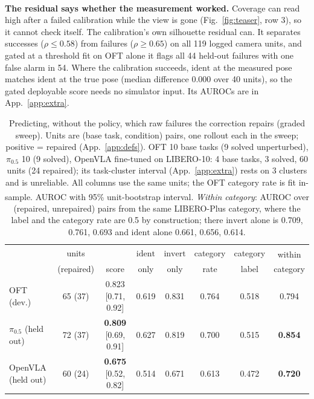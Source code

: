 \documentclass{article}
\newcommand{\ident}{\mathrm{ident}}
\newcommand{\invert}{\mathrm{invert}}
\newcommand{\pihalf}{$\pi_{0.5}$}
\newcommand{\ph}{\textsuperscript{\dag}}
\begin{document}
\textbf{The residual says whether the measurement worked.}\ph{} Coverage can read high after a failed calibration
while the view is gone (Fig.~\ref{fig:teaser}, row 3), so it cannot check itself. The calibration's own silhouette
residual can. It separates successes ($\rho \le 0.58$) from failures ($\rho \ge 0.65$) on all 119 logged camera units,
and gated at a threshold fit on OFT alone it flags all 44 held-out failures with one false alarm in 54. Where the
calibration succeeds, $\ident$ at the measured pose matches $\ident$ at the true pose (median difference 0.000 over 40
units), so the gated deployable score needs no simulator input. Its AUROCs are in App.~\ref{app:extra}.

\begin{table}[t]
\centering\footnotesize
\caption{Predicting, without the policy, which raw failures the correction repairs (graded sweep). Units are (base
task, condition) pairs, one rollout each in the sweep; positive = repaired (App.~\ref{app:defs}). OFT 10 base tasks (9
solved unperturbed), \pihalf{} 10 (9 solved), OpenVLA fine-tuned on LIBERO-10: 4 base tasks, 3 solved, 60 units (24
repaired); its task-cluster interval (App.~\ref{app:extra}) rests on 3 clusters and is unreliable. All columns use the
same units; the OFT category rate is fit in-sample. AUROC with 95\% unit-bootstrap interval. \emph{Within category}\ph:
AUROC over (repaired, unrepaired) pairs from the same LIBERO-Plus category, where the label and the category rate are
0.5 by construction; there $\invert$ alone is 0.709, 0.761, 0.693 and $\ident$ alone 0.661, 0.656, 0.614.}
\label{tab:score}
\setlength{\tabcolsep}{3.3pt}
\begin{tabular}{lccccccc}
\toprule
 & units & & $\ident$ & $\invert$ & category & category & within\ph \\
 & (repaired) & score & only & only & rate & label & category \\
\midrule
OFT (dev.) & 65 (37) & 0.823 [0.71, 0.92] & 0.619 & 0.831 & 0.764 & 0.518 & 0.794 \\
\pihalf{} (held out) & 72 (37) & \textbf{0.809} [0.69, 0.91] & 0.627 & 0.819 & 0.700 & 0.515 & \textbf{0.854} \\
OpenVLA (held out) & 60 (24) & \textbf{0.675} [0.52, 0.82] & 0.514 & 0.671 & 0.613 & 0.472 & \textbf{0.720} \\
\bottomrule
\end{tabular}
\end{table}
\end{document}
